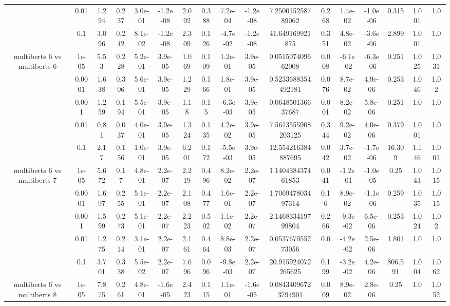 \begin{tabular}{|c|c|c|c|c|c|c|c|c|c|c|c|c|c|c|c|c|}
 & 0.01 & 1.294 & 0.237 & 3.0e-01 & -1.2e-08 & 2.092 & 0.388 & 7.2e-04 & -1.2e-08 & 7.250015258789062 & 0.268 & 1.4e-02 & -1.0e-06 & 0.315 & 1.001 & 1.0 \\
 & 0.1 & 3.096 & 0.242 & 8.1e-02 & -1.2e-08 & 2.309 & 0.126 & -4.7e-02 & -1.2e-08 & 41.649169921875 & 0.351 & 4.8e-02 & -3.6e-06 & 2.899 & 1.001 & 1.0 \\
\hline
\multirow{5}{*}{multiberts 6 vs multiberts 6} & 1e-05 & 5.53 & 0.228 & 5.2e-01 & 3.9e-05 & 1.069 & 0.109 & 1.2e-01 & 3.9e-05 & 0.051507409662008 & 0.008 & -6.1e-02 & -6.3e-06 & 0.251 & 1.025 & 1.031 \\
 & 0.0001 & 1.638 & 0.306 & 5.6e-01 & 3.9e-05 & 1.229 & 0.166 & 1.8e-01 & 3.9e-05 & 0.5233688354492181 & 0.076 & 8.7e-02 & 4.9e-06 & 0.253 & 1.046 & 1.02 \\
 & 0.001 & 1.259 & 0.194 & 5.5e-01 & 3.9e-05 & 1.18 & 0.15 & -6.3e-03 & 3.9e-05 & 0.064850136637687 & 0.001 & 8.2e-02 & 5.8e-06 & 0.251 & 1.0 & 1.0 \\
 & 0.01 & 0.81 & 0.037 & 4.0e-01 & 3.9e-05 & 1.324 & 0.135 & 4.2e-02 & 3.9e-05 & 7.5613555908203125 & 0.344 & 9.2e-02 & 4.0e-06 & 0.379 & 1.001 & 1.0 \\
 & 0.1 & 2.17 & 0.156 & 1.0e-01 & 3.9e-05 & 6.201 & 0.172 & -5.5e-03 & 3.9e-05 & 12.554216384887695 & 0.042 & 3.7e-02 & -1.7e-06 & 16.309 & 1.146 & 1.001 \\
\hline
\multirow{5}{*}{multiberts 6 vs multiberts 7} & 1e-05 & 5.672 & 0.17 & 4.8e-01 & 2.2e-07 & 2.219 & 0.496 & 8.2e-02 & 2.2e-07 & 1.140438437461853 & 0.041 & -1.2e-01 & -1.0e-05 & 0.25 & 1.043 & 1.015 \\
 & 0.0001 & 1.697 & 0.255 & 5.1e-01 & 2.2e-07 & 2.108 & 0.477 & 1.6e-01 & 2.2e-07 & 1.706947803497314 & 0.16 & 8.9e-02 & -1.1e-06 & 0.259 & 1.035 & 1.015 \\
 & 0.001 & 1.599 & 0.273 & 5.1e-01 & 2.2e-07 & 2.223 & 0.502 & 1.1e-02 & 2.2e-07 & 2.146833419799804 & 0.266 & -9.3e-02 & 6.5e-06 & 0.253 & 1.024 & 1.02 \\
 & 0.01 & 1.275 & 0.214 & 3.1e-01 & 2.2e-07 & 2.161 & 0.464 & 8.8e-03 & 2.2e-07 & 0.053767055273056 & 0.0 & -4.2e-02 & 2.5e-06 & 1.801 & 1.0 & 1.0 \\
 & 0.1 & 3.701 & 0.338 & 5.5e-02 & 2.2e-07 & 7.696 & 0.096 & -9.8e-03 & 2.2e-07 & 20.915924072265625 & 0.199 & -3.2e-02 & 4.2e-06 & 806.591 & 1.004 & 1.062 \\
\hline
\multirow{5}{*}{multiberts 6 vs multiberts 8} & 1e-05 & 7.875 & 0.261 & 4.8e-01 & -1.6e-05 & 2.423 & 0.115 & 1.1e-01 & -1.6e-05 & 0.08434096723794901 & 0.009 & 8.9e-02 & 2.8e-06 & 0.25 & 1.0 & 1.052 \\

\end{tabular}
